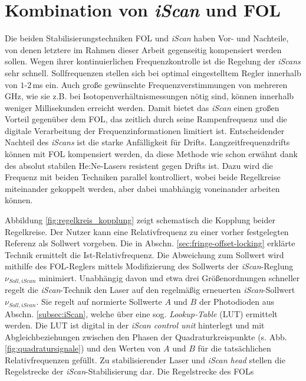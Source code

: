 \section{Kombination von \textit{iScan} und
FOL}\label{sec:iscan_und_fringe-offset-locking}
Die beiden Stabilisierungstechniken FOL und \textit{iScan} haben
Vor- und Nachteile, von denen letztere im Rahmen dieser Arbeit gegenseitig
kompensiert werden sollen.
Wegen ihrer kontinuierlichen Frequenzkontrolle ist die Regelung der
\textit{iScans} sehr schnell. Sollfrequenzen stellen sich bei optimal
eingestelltem Regler innerhalb von $1$-$2\,$ms ein. Auch große gewünschte
Frequenzverstimmungen von mehreren GHz, wie sie z.B. bei
Isotopenverhältnismessungen nötig sind, können innerhalb weniger Millisekunden
erreicht werden. Damit bietet das \textit{iScan} einen großen Vorteil gegenüber
dem FOL, das zeitlich durch seine Rampenfrequenz und die digitale Verarbeitung
der Frequenzinformationen limitiert ist.
Entscheidender Nachteil des \textit{iScans} ist die starke Anfälligkeit für
Drifts.
Langzeitfrequenzdrifts können mit FOL kompensiert werden, da
diese Methode wie schon erwähnt dank des absolut stabilen He:Ne-Lasers resistent
gegen Drifts ist. Dazu wird die Frequenz mit beiden Techniken parallel
kontrolliert, wobei beide Regelkreise miteinander gekoppelt werden, aber
dabei unabhängig voneinander arbeiten können.\par
Abbildung \ref{fig:regelkreis_kopplung} zeigt schematisch die Kopplung beider
Regelkreise. Der Nutzer kann eine Relativfrequenz zu einer vorher festgelegten
Referenz als Sollwert vorgeben. Die in Abschn. \ref{sec:fringe-offset-locking} erklärte Technik ermittelt die Ist-Relativfrequenz. Die Abweichung zum Sollwert
wird mithilfe des FOL-Reglers mittels Modifizierung des
Sollwerts der \textit{iScan}-Reglung $\nu_{Soll,iScan}$ minimiert. Unabhängig
davon und etwa drei Größenordnungen schneller regelt die \textit{iScan}-Technik
den Laser auf den regelmäßig erneuerten \textit{iScan}-Sollwert
$\nu_{Soll,iScan}$. Sie regelt auf normierte Sollwerte $A$ und $B$ der Photodioden aus Abschn. \ref{subsec:iScan},
welche über eine sog. \textit{Lookup-Table} (LUT) ermittelt werden. Die
LUT ist digital in der \textit{iScan control unit} hinterlegt und mit
Abgleichbeziehungen zwischen den Phasen der Quadraturkreispunkte (s. Abb.
\ref{fig:quadratursignale}) und den Werten von $A$ und $B$ für die tatsächlichen
Relativfrequenzen gefüllt.
Zu stabilisierender Laser und \textit{iScan head} stellen die Regelstrecke der
\textit{iScan}-Stabilisierung dar. Die Regelstrecke des FOLs
